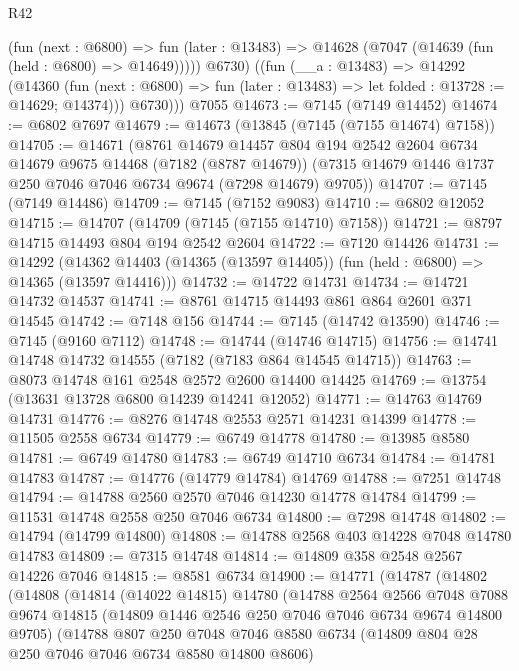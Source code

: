 \begin{lexlean}{R42}
\begin{coremodule}
{          (fun (next : @6800) =>
          fun (later : @13483) => @14628 (@7047 (@14639 (fun (held : @6800) => @14649)))))
          @6730)
        ((fun (__a : @13483) =>
        @14292
          (@14360
            (fun (next : @6800) => fun (later : @13483) => let folded : @13728 := @14629; @14374)))
          @6730)))
    @7055
@14673 := @7145 (@7149 @14452)
@14674 := @6802 @7697
@14679 := @14673 (@13845 (@7145 (@7155 @14674) @7158))
@14705 := @14671
    (@8761
      @14679
      @14457
      @804
      @194
      @2542
      @2604
      @6734
      @14679
      @9675
      @14468
      (@7182 (@8787 @14679))
      (@7315 @14679 @1446 @1737 @250 @7046 @7046 @6734 @9674 (@7298 @14679) @9705))
@14707 := @7145 (@7149 @14486)
@14709 := @7145 (@7152 @9083)
@14710 := @6802 @12052
@14715 := @14707 (@14709 (@7145 (@7155 @14710) @7158))
@14721 := @8797 @14715 @14493 @804 @194 @2542 @2604
@14722 := @7120 @14426
@14731 := @14292
    (@14362 @14403 (@14365 (@13597 @14405)) (fun (held : @6800) => @14365 (@13597 @14416)))
@14732 := @14722 @14731
@14734 := @14721 @14732 @14537
@14741 := @8761 @14715 @14493 @861 @864 @2601 @371 @14545
@14742 := @7148 @156
@14744 := @7145 (@14742 @13590)
@14746 := @7145 (@9160 @7112)
@14748 := @14744 (@14746 @14715)
@14756 := @14741 @14748 @14732 @14555 (@7182 (@7183 @864 @14545 @14715))
@14763 := @8073 @14748 @161 @2548 @2572 @2600 @14400 @14425
@14769 := @13754 (@13631 @13728 @6800 @14239 @14241 @12052)
@14771 := @14763 @14769 @14731
@14776 := @8276 @14748 @2553 @2571 @14231 @14399
@14778 := @11505 @2558 @6734
@14779 := @6749 @14778
@14780 := @13985 @8580
@14781 := @6749 @14780
@14783 := @6749 @14710 @6734
@14784 := @14781 @14783
@14787 := @14776 (@14779 @14784) @14769
@14788 := @7251 @14748
@14794 := @14788 @2560 @2570 @7046 @14230 @14778 @14784
@14799 := @11531 @14748 @2558 @250 @7046 @6734
@14800 := @7298 @14748
@14802 := @14794 (@14799 @14800)
@14808 := @14788 @2568 @403 @14228 @7048 @14780 @14783
@14809 := @7315 @14748
@14814 := @14809 @358 @2548 @2567 @14226 @7046
@14815 := @8581 @6734
@14900 := @14771
    (@14787
      (@14802
        (@14808
          (@14814
            (@14022 @14815)
            @14780
            (@14788
              @2564
              @2566
              @7048
              @7088
              @9674
              @14815
              (@14809 @1446 @2546 @250 @7046 @7046 @6734 @9674 @14800 @9705)
              (@14788
                @807
                @250
                @7048
                @7046
                @8580
                @6734
                (@14809 @804 @28 @250 @7046 @7046 @6734 @8580 @14800 @8606)
}
\end{coremodule}
\end{lexlean}
